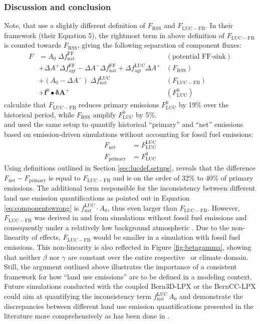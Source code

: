 \subsubsection{Discussion and conclusion}
Note, that \citet{strassmann08tel} use a slightly different definition of $F_{\mathrm{RSS}}$ and $F_{\mathrm{LUC-FB}}$. In their framework (their Equation 5), the rightmost term in above definition of $F_{\mathrm{LUC-FB}}$ is counted towards $F_{\mathrm{RSS}}$, giving the following separation of component fluxes:
\begin{align}
F &= A_0 \; \Delta f^{\text{FF}}_{\text{nat}} &(\text{potential FF-sink})\\
  &+ \Delta A^+ \Delta f_{\text{agr}}^{\text{FF}} -  \Delta A^- \Delta f_{\text{nat}}^{\text{FF}} + \Delta f^{\text{LUC}}_{\text{agr}} \Delta A^+ &(F_{\mathrm{RSS}})\\
  &+ (A_0-\Delta A^-)\;\Delta f^{\text{LUC}}_{\text{nat}}  &(F_{\mathrm{LUC-FB}})\\
  &+ \mathbf{f}^0\bullet \mathbf{\delta A^+} &(F^0_{\mathrm{LUC}})
\end{align}
\citet{strassmann08tel} calculate that $F_{\mathrm{LUC-FB}}$ reduces primary emissions $F^0_{\mathrm{LUC}}$ by 19\% over the historical period, while $F_{\mathrm{RSS}}$ amplify $F^0_{\mathrm{LUC}}$ by 5\%.\\

\citet{pongratz09} and \citet{stocker11bg} used the same setup to quantify historical ``primary'' and ``net'' emissions based on emission-driven simulations without accounting for fossil fuel emissions: 
\begin{align}
F_{\text{net}}    &= F_{\text{LUC}}^{\text{LUC}}\\
F_{\text{primary}} &= F_{\text{LUC}}^0
\end{align}
Using definitions outlined in Section \ref{sec:lucdef.setups}, reveals that the difference $F_{\text{net}} - F_{\text{primary}}$ is equal to $F_{\mathrm{LUC-FB}}$ and is on the order of 32\% \citep{stocker11bg} to 40\% \citep{pongratz09} of primary emissions. The additional term responsible for the inconsistency between different land use emission quantifications as pointed out in Equation \ref{eq:componentswrong} is $f^{\mathrm{LUC}}_{\mathrm{nat}}\cdot A_0$, thus even larger than $F_{\mathrm{LUC-FB}}$. However, $F_{\mathrm{LUC-FB}}$ was derived in \citet{pongratz09} and \citet{stocker11bg} from simulations without fossil fuel emissions and consequently under a relatively low background atmospheric \coo . Due to the non-linearity of effects, $F_{\mathrm{LUC-FB}}$ would be smaller in a simulation with fossil fuel emissions. This non-linearity is also reflected in Figure \ref{fig:betagamma}, showing that neither $\beta$ nor $\gamma$ are constant over the entire respective \coo\ or climate domain. Still, the argument outlined above illustrates the importance of a consistent framework for how ``land use emissions'' are to be defined in a modeling context. Future simulations conducted with the coupled Bern3D-LPX or the BernCC-LPX could aim at quantifying the inconsistency term $f^{\mathrm{LUC}}_{\mathrm{nat}}\,A_0$ and demonstrate the discrepancies between different land use emission quantifications presented in the literature more comprehensively as has been done in \citet{gasserciais13}.  
